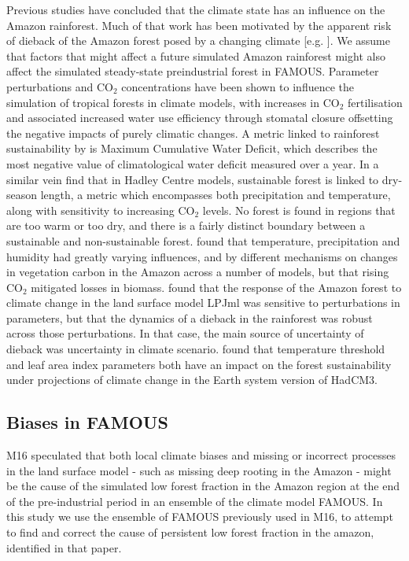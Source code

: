 \documentclass[gmd, manuscript]{copernicus}
\begin{document}
Previous studies have concluded that the climate state has an influence on the Amazon rainforest. Much of that work has been motivated by the apparent risk of dieback of the Amazon forest posed by a changing climate [e.g. \cite{malhi2008climate, cox2004amazonian}].  We assume that factors that might affect a future simulated Amazon rainforest might also affect the simulated steady-state preindustrial forest in FAMOUS. Parameter perturbations and CO$_{2}$ concentrations have been shown to influence the simulation of tropical forests in climate models, with increases in CO$_{2}$ fertilisation and associated increased water use efficiency through stomatal closure offsetting the negative impacts of purely climatic changes. A metric linked to rainforest sustainability by \cite{malhi2009exploring} is Maximum Cumulative Water Deficit, which describes the most negative value of climatological water deficit measured over a year. In a similar vein \cite{Good2011, Good2013} find that in Hadley Centre models, sustainable forest is linked to dry-season length, a metric which encompasses both precipitation and temperature, along with sensitivity to increasing CO$_{2}$ levels. No forest is found in regions that are too warm or too dry, and there is a fairly distinct boundary between a sustainable and non-sustainable forest. \cite{Galbraith2010} found that temperature, precipitation and humidity had greatly varying influences, and by different mechanisms on changes in vegetation carbon in the Amazon across a number of models, but that rising CO$_{2}$ mitigated losses in biomass. \cite{POULTER2010} found that the response of the Amazon forest to climate change in the land surface model LPJml was sensitive to perturbations in parameters, but that the dynamics of a dieback in the rainforest was robust across those perturbations. In that case, the main source of uncertainty of dieback was uncertainty in climate scenario. \cite{boulton2017exploring} found that temperature threshold and leaf area index parameters both have an impact on the forest sustainability under projections of climate change in the Earth system version of HadCM3.

\subsection{Biases in FAMOUS}\label{ssec:biases}

M16 speculated that both local climate biases and missing or incorrect processes in the land surface model - such as missing deep rooting in the Amazon - might be the cause of the simulated low forest fraction in the Amazon region at the end of the pre-industrial period in an ensemble of the climate model FAMOUS. In this study we use the ensemble of FAMOUS previously used in M16, to attempt to find and correct the cause of persistent low forest fraction in the amazon, identified in that paper. 
\end{document}
